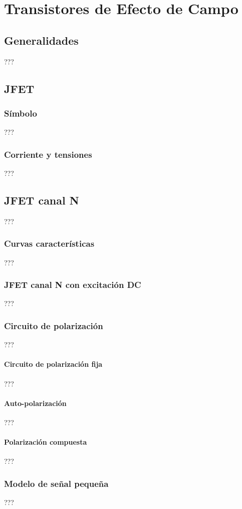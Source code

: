 
\chapter{Transistores de Efecto de Campo}
\section{Generalidades}
???
\section{JFET}
\subsection{Símbolo}
???
\subsection{Corriente y tensiones}
???
\section{JFET canal N}
???
\subsection{Curvas características}
???
\subsection{JFET canal N con excitación DC}
???
\subsection{Circuito de polarización}
???
\subsubsection{Circuito de polarización fija}
???
\subsubsection{Auto-polarización}
???
\subsubsection{Polarización compuesta}
???
\subsection{Modelo de señal pequeña}
???
